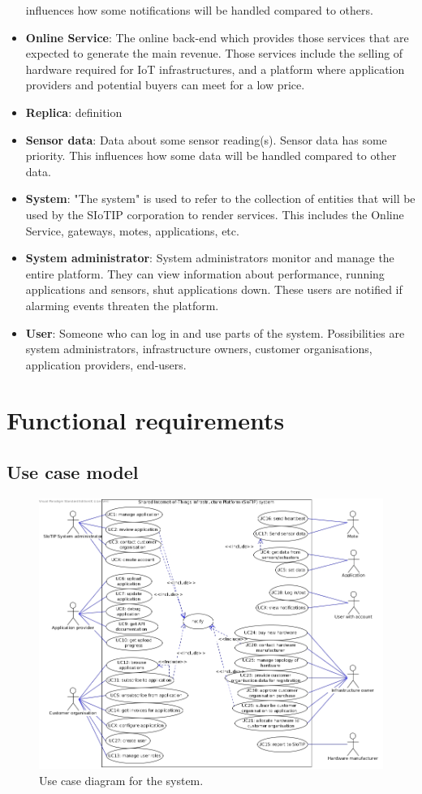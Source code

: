 \documentclass[english]{sareport}
\begin{document}
\begin{itemize}
    influences how some notifications will be handled compared to others.
    \item \textbf{Online Service}: The online back-end which provides those
    services that are expected to generate the main revenue. Those services
    include the selling of hardware required for IoT infrastructures, and a
    platform where application providers and potential buyers can meet for a low price.
    \item \textbf{Replica}: definition
    \item \textbf{Sensor data}: Data about some sensor reading(s). Sensor
    data has some priority. This influences how some data will be handled
    compared to other data.
    \item \textbf{System}: "The system" is used to refer to the collection
    of entities that will be used by the SIoTIP corporation to render services.
    This includes the Online Service, gateways, motes, applications, etc.
    \item \textbf{System administrator}: System administrators monitor and
    manage the entire platform. They can view information about performance,
    running applications and sensors, shut applications down. These users are
    notified if alarming events threaten the platform.
    \item \textbf{User}: Someone who can log in and use parts of the system.
    Possibilities are system administrators, infrastructure owners, customer
    organisations, application providers, end-users.
\end{itemize}

\chapter{Functional requirements}\label{sec:functional}
\section{Use case model}

\begin{figure}[!htp]
    \centering
    \includegraphics[width=1\textwidth]{Use_Case_Diagram1.jpg}
    \caption{Use case diagram for the system.}\label{fig:use_case_model}
\end{figure}



\end{document}
